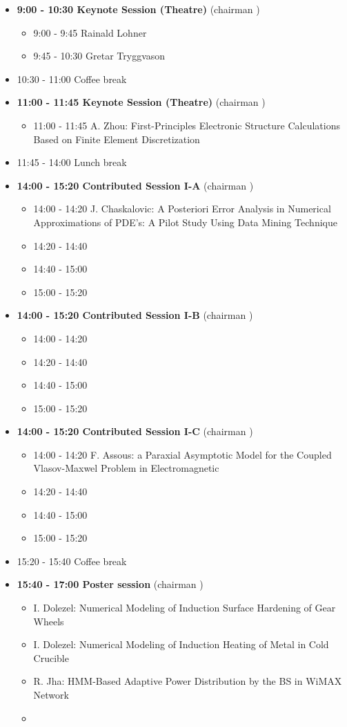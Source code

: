 \documentclass[10pt, A4]{article}%
\begin{document}
\begin{itemize}    
  \item {\bf 9:00 - 10:30 Keynote Session (Theatre)} (chairman ) 
  \begin{itemize}
    \item 9:00 - 9:45 Rainald Lohner
    \item 9:45 - 10:30 Gretar Tryggvason
  \end{itemize}
  \item 10:30 - 11:00 Coffee break
  \item {\bf 11:00 - 11:45 Keynote Session (Theatre)} (chairman ) 
  \begin{itemize}
    \item 11:00 - 11:45 {A. Zhou}: {First-Principles Electronic Structure Calculations Based on Finite Element Discretization}
  \end{itemize}
  \item 11:45 - 14:00 Lunch break      
  \item {\bf 14:00 - 15:20 Contributed Session I-A} (chairman ) 
  \begin{itemize}
    \item 14:00 - 14:20 {J. Chaskalovic}: {A Posteriori Error Analysis in Numerical Approximations of PDE's: A Pilot Study Using Data Mining Technique}
    \item 14:20 - 14:40 
    \item 14:40 - 15:00 
    \item 15:00 - 15:20 
  \end{itemize}
  \item {\bf 14:00 - 15:20 Contributed Session I-B} (chairman ) 
  \begin{itemize}
    \item 14:00 - 14:20 
    \item 14:20 - 14:40 
    \item 14:40 - 15:00 
    \item 15:00 - 15:20 
  \end{itemize}
    \item {\bf 14:00 - 15:20 Contributed Session I-C} (chairman ) 
  \begin{itemize}
    \item 14:00 - 14:20 {F. Assous}: {a Paraxial Asymptotic Model for the Coupled Vlasov-Maxwel Problem in Electromagnetic}
    \item 14:20 - 14:40 
    \item 14:40 - 15:00 
    \item 15:00 - 15:20 
  \end{itemize}
  \item 15:20 - 15:40 Coffee break
  \item {\bf 15:40 - 17:00 Poster session} (chairman )
  \begin{itemize}
    \item {I. Dolezel}: {Numerical Modeling of Induction Surface Hardening of Gear Wheels}
    \item {I. Dolezel}: {Numerical Modeling of Induction Heating of Metal in Cold Crucible}
    \item {R. Jha}: {HMM-Based Adaptive Power Distribution by the BS in WiMAX Network}
    \item 
    


\end{itemize}
\end{itemize}
\end{document}
